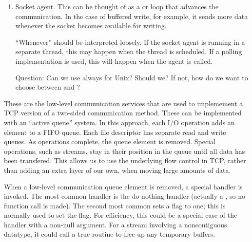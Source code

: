 \begin{enumerate}
\item Socket agent.  This can be thought of as a 
    or  loop that advances the communication.  In the case
    of buffered write, for example, it sends more data whenever the
    socket becomes available for writing.

    ``Whenever'' should be interpreted loosely.  If the socket
    agent is running in a separate thread, this may happen when the
    thread is scheduled.  If a polling implementation is used, this
    will happen when the agent is called.

    Question: Can we use  always for Unix?  Should we?  If not, how
    do we want to choose between  and ?

\end{enumerate}

These are the low-level communication services that are used to
implemement a TCP version of a two-sided communication method.
These can be implemented with an ``active queue'' system.  In this
approach, each I/O operation adds an element to a FIFO queue.  Each
file descriptor has separate read and write queues.  As operations
complete, the queue element is removed.  Special operations, such as
streams, stay in their position in the queue until all data has been
transfered.  This allows us to use the underlying flow control in TCP,
rather than adding an extra layer of our own, when moving large
amounts of data.

When a low-level communication queue element is removed, a special handler is
invoked.  The 
most common handler is the do-nothing handler (actually a , so no
function call is made).  The second most common
sets a flag to one; this is normally used to set the
 flag.  For efficiency, this could be a
special case of the  handler with a non-null argument.
For a stream involving a noncontiguous datatype, it could call a true
routine to free up any temporary buffers.

